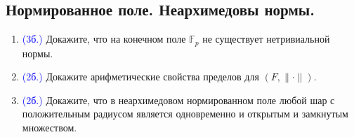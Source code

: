 \documentclass[11pt]{article}
\begin{document}
    \subsection{Нормированное поле. Неархимедовы нормы.}
    \begin{enumerate}[start=1,label={\bfseries \arabic*.}]
        \item \textcolor{blue}{(3б.)} Докажите, что на конечном поле $\mathbb{F}_{p}$ не существует нетривиальной нормы.

        \item \textcolor{blue}{(2б.)} Докажите арифметические свойства пределов для $(F, \| \cdot \|)$.

        \item \textcolor{blue}{(2б.)} Докажите, что в неархимедовом нормированном поле любой шар с положительным радиусом является одновременно и открытым
              и замкнутым множеством.
    \end{enumerate}
\end{document}
